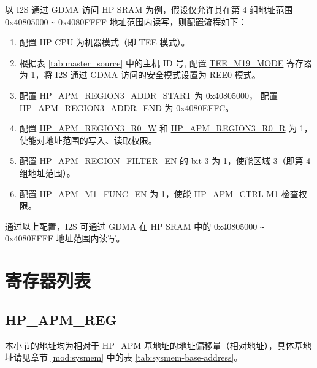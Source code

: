 \documentclass[main\_\_CN.tex]{subfiles}
\begin{document}
以 I2S 通过 GDMA 访问 HP SRAM 为例，假设仅允许其在第 4 组地址范围 0x40805000 \verb+~+ 0x4080FFFF 地址范围内读写，则配置流程如下：

\begin{enumerate}
    \item 配置 HP CPU 为机器模式（即 TEE 模式）。

    \item 根据表 \ref{tab:master_source} 中的主机 ID 号, 配置 \hyperref[fielddesc:TEEMNMODE]{TEE\_M19\_MODE} 寄存器为 1，将 I2S 通过 GDMA 访问的安全模式设置为 REE0 模式。

    \item 配置 \hyperref[regdesc:HPAPMREGIONNADDRSTARTREG]{HP\_APM\_REGION3\_ADDR\_START} 为 0x40805000， 配置 \hyperref[regdesc:HPAPMREGIONNADDRSTARTREG]{HP\_APM\_REGION3\_ADDR\_END} 为 0x4080EFFC。

    \item 配置 \hyperref[fielddesc:HPAPMREGIONNR0W]{HP\_APM\_REGION3\_R0\_W} 和 \hyperref[fielddesc:HPAPMREGIONNR0R]{HP\_APM\_REGION3\_R0\_R} 为 1，使能对地址范围的写入、读取权限。

    \item 配置 \hyperref[fielddesc:HPAPMREGIONFILTEREN]{HP\_APM\_REGION\_FILTER\_EN} 的 bit 3 为 1，使能区域 3（即第 4 组地址范围）。

    \item 配置 \hyperref[fielddesc:HPAPMM1FUNCEN]{HP\_APM\_M1\_FUNC\_EN} 为 1，使能 HP\_APM\_CTRL M1 检查权限。
\end{enumerate}

通过以上配置，I2S 可通过 GDMA 在 HP SRAM 中的 0x40805000 \verb+~+ 0x4080FFFF 地址范围内读写。




\hypertarget{permctrl-reg-summ}{}
\section{寄存器列表}
\label{sec:permctrl-reg-summ}

\subsection{HP\_APM\_REG}
\label{sec:permctrl-reg-hp}

本小节的地址均为相对于 HP\_APM 基地址的地址偏移量（相对地址），具体基地址请见章节 \ref{mod:sysmem} \textit{} 中的表 \ref{tab:sysmem-base-address}。
\end{document}

